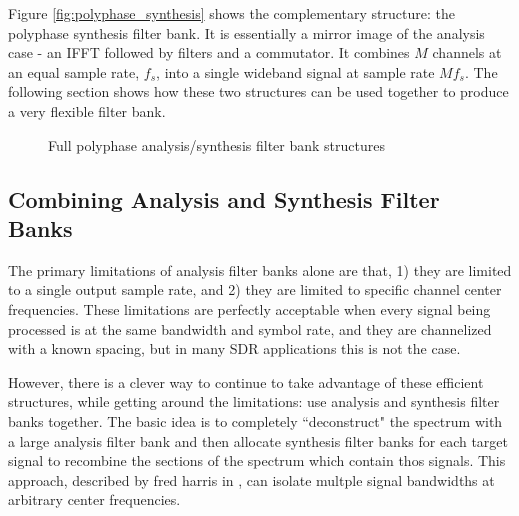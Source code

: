 \documentclass[12pt]{article}
\begin{document}
Figure \ref{fig:polyphase_synthesis} shows the complementary structure: the
polyphase synthesis filter bank. It is essentially a mirror image of the
analysis case - an IFFT followed by filters and a commutator. It combines $M$
channels at an equal sample rate, $f_s$, into a single wideband signal at
sample rate $Mf_s$.  The following section shows how these two structures can
be used together to produce a very flexible filter bank.

\begin{figure}[h!]
\centerline{
    \hfill
}
\caption{Full polyphase analysis/synthesis filter bank structures}
\label{fig:poly_analysis_synthesis_structs}
\end{figure}


\subsection{Combining Analysis and Synthesis Filter Banks}
\label{sec:combine_analysis_synthesis}
The primary limitations of analysis filter banks alone are that, 1) they are
limited to a single output sample rate, and 2) they are limited to specific
channel center frequencies. These limitations are perfectly acceptable when
every signal being processed is at the same bandwidth and symbol rate, and they
are channelized with a known spacing, but in many SDR applications this is not
the case.

However, there is a clever way to continue to take advantage of these efficient
structures, while getting around the limitations: use analysis and synthesis
filter banks together. The basic idea is to completely ``deconstruct" the
spectrum with a large analysis filter bank and then allocate synthesis
filter banks for each target signal to recombine the sections of the spectrum
which contain thos signals. This approach, described by fred harris in
\cite{Harris2}, can isolate multple signal bandwidths at arbitrary center
frequencies.
\end{document}

